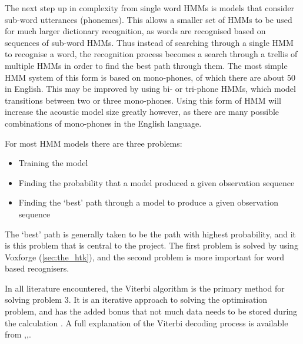 The next step up in complexity from single word HMMs is models that consider sub-word utterances (phonemes).  This allows a smaller set of HMMs to be used for much larger dictionary recognition, as words are recognised based on sequences of sub-word HMMs.  Thus instead of searching through a single HMM to recognise a word, the recognition process becomes a search through a trellis of multiple HMMs in order to find the best path through them.  The most simple HMM system of this form is based on mono-phones, of which there are about 50 in English.  This may be improved by using bi- or tri-phone HMMs, which model transitions between two or three mono-phones.  Using this form of HMM will increase the acoustic model size greatly however, as there are many possible combinations of mono-phones in the English language.

For most HMM models there are three problems: 
\begin{itemize}
	\item Training the model
	\item Finding the probability that a model produced a given observation sequence
	\item Finding the `best' path through a model to produce a given observation sequence
\end{itemize}
The `best' path is generally taken to be the path with highest probability, and it is this problem that is central to the project.  The first problem is solved by using Voxforge (\ref{sec:the_htk}), and the second problem is more important for word based recognisers.

In all literature encountered, the Viterbi algorithm is the primary method for solving problem 3.  It is an iterative approach to solving the optimisation problem, and has the added bonus that not much data needs to be stored during the calculation \cite{schuster2006speech}.  A full explanation of the Viterbi decoding process is available from \cite{rabiner1989tutorial},\cite{melnikoff2003speech},\cite{saeed2008advanced}.

